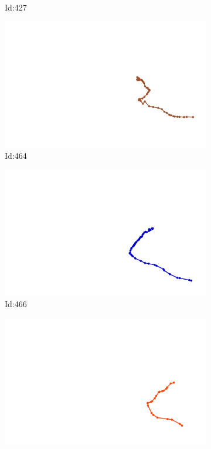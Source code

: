 \documentclass[12pt,twoside]{report}
\begin{document}
\begin{figure}
\begin{subfigure}[b]{0.20\textwidth}
\caption{Id:427}
\end{subfigure}
\begin{subfigure}[b]{0.20\textwidth}
\centering
\includegraphics[width=\textwidth]{../trajectories/464.png}
\caption{Id:464}
\end{subfigure}
\begin{subfigure}[b]{0.20\textwidth}
\centering
\includegraphics[width=\textwidth]{../trajectories/466.png}
\caption{Id:466}
\end{subfigure}
\begin{subfigure}[b]{0.20\textwidth}
\centering
\includegraphics[width=\textwidth]{../trajectories/475.png}

\end{subfigure}
\end{figure}
\end{document}

